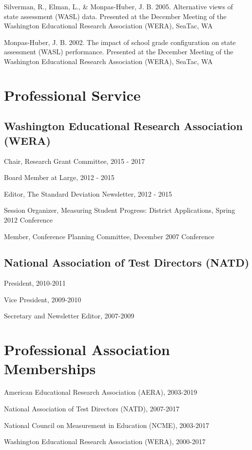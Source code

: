 \documentclass[
  letterpaper,
]{article}
\begin{document}
Silverman, R., Elman, L., \& Monpas-Huber, J. B. 2005. Alternative views
of state assessment (WASL) data. Presented at the December Meeting of
the Washington Educational Research Association (WERA), SeaTac, WA

Monpas-Huber, J. B. 2002. The impact of school grade configuration on
state assessment (WASL) performance. Presented at the December Meeting
of the Washington Educational Research Association (WERA), SeaTac, WA

\section{Professional Service}\label{professional-service}

\subsection{Washington Educational Research Association
(WERA)}\label{washington-educational-research-association-wera}

Chair, Research Grant Committee, 2015 - 2017

Board Member at Large, 2012 - 2015

Editor, The Standard Deviation Newsletter, 2012 - 2015

Session Organizer, Measuring Student Progress: District Applications,
Spring 2012 Conference

Member, Conference Planning Committee, December 2007 Conference

\subsection{National Association of Test Directors
(NATD)}\label{national-association-of-test-directors-natd}

President, 2010-2011

Vice President, 2009-2010

Secretary and Newsletter Editor, 2007-2009

\section{Professional Association
Memberships}\label{professional-association-memberships}

American Educational Research Association (AERA), 2003-2019

National Association of Test Directors (NATD), 2007-2017

National Council on Measurement in Education (NCME), 2003-2017

Washington Educational Research Association (WERA), 2000-2017
\end{document}
